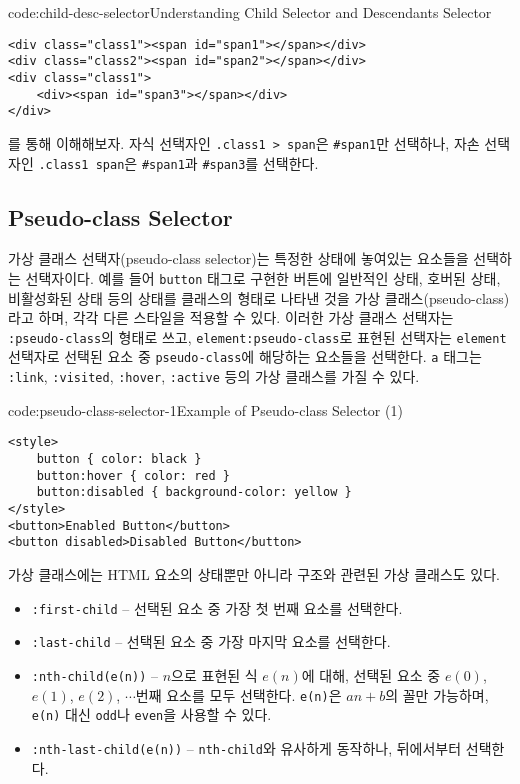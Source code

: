 \begin{codeenv}{code:child-desc-selector}{Understanding Child Selector and Descendants Selector}\begin{verbatim}
<div class="class1"><span id="span1"></span></div>
<div class="class2"><span id="span2"></span></div>
<div class="class1">
    <div><span id="span3"></span></div>
</div>
\end{verbatim}
\end{codeenv}

를 통해 이해해보자. 자식 선택자인 \texttt{.class1 > span}은 \texttt{\#span1}만 선택하나, 자손 선택자인 \texttt{.class1 span}은 \texttt{\#span1}과 \texttt{\#span3}를 선택한다.

\subsection*{Pseudo-class Selector}
가상 클래스 선택자(pseudo-class selector)는 특정한 상태에 놓여있는 요소들을 선택하는 선택자이다. 예를 들어 \texttt{button} 태그로 구현한 버튼에 일반적인 상태, 호버된 상태, 비활성화된 상태 등의 상태를 클래스의 형태로 나타낸 것을 가상 클래스(pseudo-class)라고 하며, 각각 다른 스타일을 적용할 수 있다. 이러한 가상 클래스 선택자는 \texttt{:pseudo-class}의 형태로 쓰고, \texttt{element:pseudo-class}로 표현된 선택자는 \texttt{element} 선택자로 선택된 요소 중 \texttt{pseudo-class}에 해당하는 요소들을 선택한다. \texttt{a} 태그는 \texttt{:link}, \texttt{:visited}, \texttt{:hover}, \texttt{:active} 등의 가상 클래스를 가질 수 있다.

\begin{codeenv}{code:pseudo-class-selector-1}{Example of Pseudo-class Selector (1)}\begin{verbatim}
<style>
    button { color: black }
    button:hover { color: red }
    button:disabled { background-color: yellow }
</style>
<button>Enabled Button</button>
<button disabled>Disabled Button</button>
\end{verbatim}
\end{codeenv}

가상 클래스에는 HTML 요소의 상태뿐만 아니라 구조와 관련된 가상 클래스도 있다.

\begin{itemize}
    \item \texttt{:first-child} – 선택된 요소 중 가장 첫 번째 요소를 선택한다.
    \item \texttt{:last-child} – 선택된 요소 중 가장 마지막 요소를 선택한다.
    \item \texttt{:nth-child(e(n))} – $n$으로 표현된 식 $e(n)$에 대해, 선택된 요소 중 $e(0)$, $e(1)$, $e(2)$, $\cdots$번째 요소를 모두 선택한다. \texttt{e(n)}은 $an+b$의 꼴만 가능하며, \texttt{e(n)} 대신 \texttt{odd}나 \texttt{even}을 사용할 수 있다.
    \item \texttt{:nth-last-child(e(n))} – \texttt{nth-child}와 유사하게 동작하나, 뒤에서부터 선택한다.
\end{itemize}

